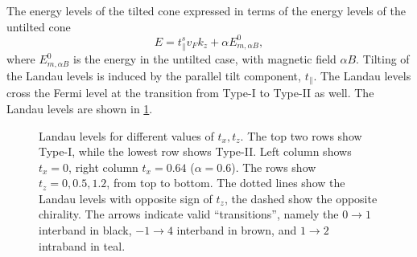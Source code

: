 The energy levels of the tilted cone expressed in terms of the energy levels of the untilted cone
\[
E = t^s_{\parallel} v_F k_z + \alpha E^0_{m, \alpha B},
\]
where \( E^0_{m, \alpha B} \) is the energy in the untilted case, with magnetic field \( \alpha B \).
Tilting of the Landau levels is induced by the parallel tilt component, \( t_\parallel \).
The Landau levels cross the Fermi level at the transition from Type-I to Type-II as well.
The Landau levels are shown in \cref{fig:llevelstilt}.


\begin{figure}[p!]
  \centering
  \resizebox{\textwidth}{!}{
  
  }
  \caption{\label{fig:llevelstilt}Landau levels for different values of \( t_x, t_z \).
    The top two rows show Type-I, while the lowest row shows Type-II.
    Left column shows \( t_x = 0 \), right column \( t_x = 0.64 \) (\( \alpha = 0.6 \)).
    The rows show \( t_z = 0, 0.5, 1.2 \), from top to bottom.
    The dotted lines show the Landau levels with opposite sign of \( t_z \), the dashed show the opposite chirality.
    The arrows indicate valid ``transitions'', namely the \( 0\to 1 \) interband in black, \( -1 \to 4 \) interband in \textcolor{brown!70!black}{brown}, and \( 1\to 2 \) intraband in \textcolor{teal!70!black}{teal}.
  }
\end{figure}

